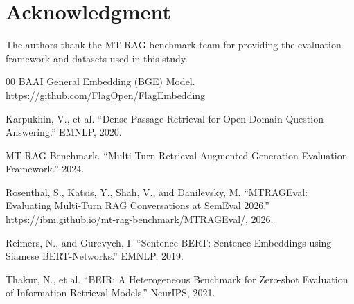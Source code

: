 \documentclass[conference]{IEEEtran}
\begin{document}
\section*{Acknowledgment}

The authors thank the MT-RAG benchmark team for providing the evaluation framework and datasets used in this study.

\begin{thebibliography}{00}
 BAAI General Embedding (BGE) Model. \url{https://github.com/FlagOpen/FlagEmbedding}

 Karpukhin, V., et al. ``Dense Passage Retrieval for Open-Domain Question Answering.'' EMNLP, 2020.

 MT-RAG Benchmark. ``Multi-Turn Retrieval-Augmented Generation Evaluation Framework.'' 2024.

 Rosenthal, S., Katsis, Y., Shah, V., and Danilevsky, M. ``MTRAGEval: Evaluating Multi-Turn RAG Conversations at SemEval 2026.'' \url{https://ibm.github.io/mt-rag-benchmark/MTRAGEval/}, 2026.

 Reimers, N., and Gurevych, I. ``Sentence-BERT: Sentence Embeddings using Siamese BERT-Networks.'' EMNLP, 2019.

 Thakur, N., et al. ``BEIR: A Heterogeneous Benchmark for Zero-shot Evaluation of Information Retrieval Models.'' NeurIPS, 2021.

\end{thebibliography}
\end{document}
